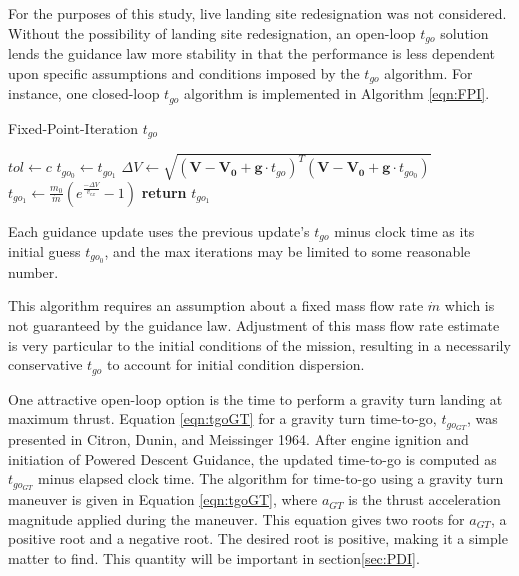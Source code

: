 For the purposes of this study, live landing site redesignation was not considered. Without the possibility of landing site redesignation, an open-loop $t_{go}$ solution lends the guidance law more stability in that the performance is less dependent upon specific assumptions and conditions imposed by the $t_{go}$ algorithm. For instance, one closed-loop $t_{go}$ algorithm is implemented in Algorithm \ref{eqn:FPI}.

\begin{algorithm}
	\caption{Fixed-Point-Iteration $t_{go}$}\label{eqn:FPI}
	\begin{algorithmic}[1]
		\State $tol\gets c$
		\State $t_{go_0} \gets t_{go_1}$
		\State $\Delta V \gets \sqrt{(\bm{V}-\bm{V_0} + \bm{g}\cdot t_{go})^T(\bm{V}-\bm{V_0} + \bm{g}\cdot t_{go_0})}$
		\State $t_{go_1} \gets \frac{m_0}{\dot{m}}\left(e^{\frac{-\Delta V}{v_{ex}}}-1\right)$ 
		\EndWhile
		\State \textbf{return} $t_{go_1}$
	\end{algorithmic}
\end{algorithm}

Each guidance update uses the previous update's $t_{go}$ minus clock time as its initial guess $t_{go_0}$, and the max iterations may be limited to some reasonable number.

This algorithm requires an assumption about a fixed mass flow rate $\dot{m}$ which is not guaranteed by the guidance law. Adjustment of this mass flow rate estimate is very particular to the initial conditions of the mission, resulting in a necessarily conservative $t_{go}$ to account for initial condition dispersion.

One attractive open-loop option is the time to perform a gravity turn landing at maximum thrust. Equation \ref{eqn:tgoGT} for a gravity turn time-to-go, $t_{go_{GT}}$, was presented in Citron, Dunin, and Meissinger 1964\:\cite{CITRON}. After engine ignition and initiation of Powered Descent Guidance, the updated time-to-go is computed as $t_{go_{GT}}$ minus elapsed clock time. The algorithm for time-to-go using a gravity turn maneuver is given in Equation \ref{eqn:tgoGT}, where $a_{GT}$ is the thrust acceleration magnitude applied during the maneuver. This equation gives two roots for $a_{GT}$, a positive root and a negative root. The desired root is positive, making it a simple matter to find. This quantity will be important in section\:\ref{sec:PDI}.

